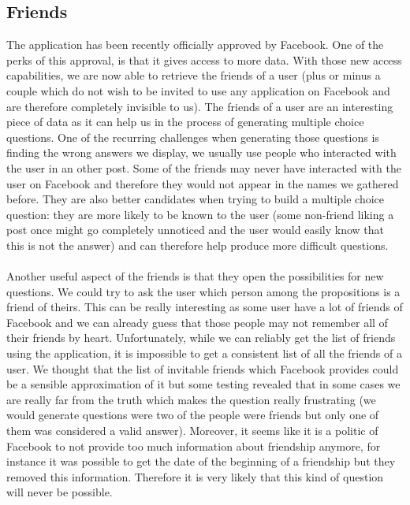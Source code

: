 \subsection{Friends}
The application has been recently officially approved by Facebook. One of the perks of this approval, is that it gives access to more data. With those new access capabilities, we are now able to retrieve the friends of a user (plus or minus a couple which do not wish to be invited to use any application on Facebook and are therefore completely invisible to us). The friends of a user are an interesting piece of data as it can help us in the process of generating multiple choice questions. One of the recurring challenges when generating those questions is finding the wrong answers we display, we usually use people who interacted with the user in an other post. Some of the friends may never have interacted with the user on Facebook and therefore they would not appear in the names we gathered before. They are also better candidates when trying to build a multiple choice question: they are more likely to be known to the user (some non-friend liking a post once might go completely unnoticed and the user would easily know that this is not the answer) and can therefore help produce more difficult questions.\\\\
Another useful aspect of the friends is that they open the possibilities for new questions. We could try to ask the user which person among the propositions is a friend of theirs. This can be really interesting as some user have a lot of friends of Facebook and we can already guess that those people may not remember all of their friends by heart. Unfortunately, while we can reliably get the list of friends using the application, it is impossible to get a consistent list of all the friends of a user. We thought that the list of invitable friends which Facebook provides could be a sensible approximation of it but some testing revealed that in some cases we are really far from the truth which makes the question really frustrating (we would generate questions were two of the people were friends but only one of them was considered a valid answer). Moreover, it seems like it is a politic of Facebook to not provide too much information about friendship anymore, for instance it was possible to get the date of the beginning of a friendship but they removed this information. Therefore it is very likely that this kind of question will never be possible.
